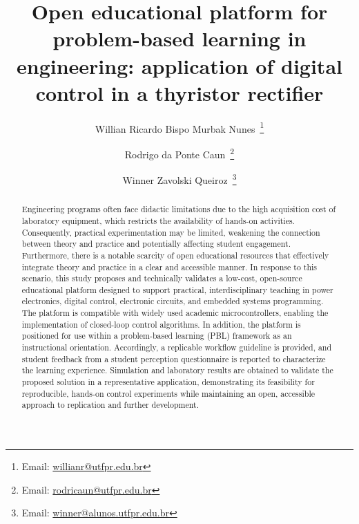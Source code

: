 \documentclass[english]{textolivre}
\title{Open educational platform for problem-based learning in engineering: application of digital control in a thyristor rectifier}
\author[1]{Willian Ricardo Bispo Murbak Nunes~\orcid{0000-0002-3574-7441}\thanks{Email: \href{mailto:willianr@utfpr.edu.br}{willianr@utfpr.edu.br}}}
\author[1]{Rodrigo da Ponte Caun~\orcid{0000-0003-1861-3609}\thanks{Email: \href{mailto:rodrigocaun@utfpr.edu.br}{rodricaun@utfpr.edu.br}}}
\author[1]{Winner Zavolski Queiroz~\orcid{0009-0005-1661-9742}\thanks{Email: \href{mailto:winner@alunos.utfpr.edu.br}{winner@alunos.utfpr.edu.br}}}
\affil[1]{Federal University of Technology - Paraná, Automation and Control Laboratory, Apucarana, PR, Brazil.}
\begin{document}
\maketitle

\begin{polyabstract}
\begin{abstract}
Engineering programs often face didactic limitations due to the high acquisition cost of laboratory equipment, which restricts the availability of hands-on activities. Consequently, practical experimentation may be limited, weakening the connection between theory and practice and potentially affecting student engagement. Furthermore, there is a notable scarcity of open educational resources that effectively integrate theory and practice in a clear and accessible manner. In response to this scenario, this study proposes and technically validates a low-cost, open-source educational platform designed to support practical, interdisciplinary teaching in power electronics, digital control, electronic circuits, and embedded systems programming. The platform is compatible with widely used academic microcontrollers, enabling the implementation of closed-loop control algorithms. In addition, the platform is positioned for use within a problem-based learning (PBL) framework as an instructional orientation. Accordingly, a replicable workflow guideline is provided, and student feedback from a student perception questionnaire is reported to characterize the learning experience. Simulation and laboratory results are obtained to validate the proposed solution in a representative application, demonstrating its feasibility for reproducible, hands-on control experiments while maintaining an open, accessible approach to replication and further development.


\end{abstract}


\end{polyabstract}
\end{document}
